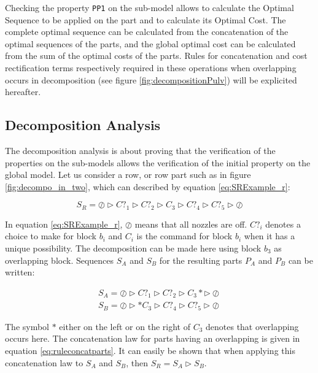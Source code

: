 Checking the property \texttt{PP1} on the sub-model allows to calculate the Optimal Sequence to be applied on the part and to calculate its Optimal Cost. 
The complete optimal sequence can be calculated from the concatenation of the optimal sequences of the parts, and the global optimal cost can be calculated from the sum of the optimal costs of the parts. Rules for concatenation and cost rectification terms respectively required in these operations when overlapping occurs in decomposition (see figure \ref{fig:decompositionPulv}) will be explicited hereafter.



\subsection{Decomposition Analysis}
\label{PreveComp}

The decomposition analysis is about proving that the verification of the properties on the sub-models allows the verification of the initial property on the global model.
Let us consider a row, or row part such as in figure \ref{fig:decompo_in_two}, which can described by equation \ref{eq:SRExample_r}:

\begin{equation}
S_R = \oslash \triangleright C?_{1} \triangleright C?_{2} \triangleright C_{3} \triangleright C?_{4} \triangleright C?_{5} \triangleright \oslash \label{eq:SRExample_r}
\end{equation}

 In equation \ref{eq:SRExample_r}, $\oslash$ means that all nozzles are off. $C?_{i}$ denotes a choice to make for block $b_i$ and $C_{i}$ is the command for block $b_{i}$ when it has a unique possibility. The decomposition can be made here using block $b_3$ as overlapping block.  Sequences $S_A$ and $S_B$ for the resulting parts $P_A$ and $P_B$ can be written:

\begin{eqnarray}
S_A = \oslash \triangleright C?_1 \triangleright C?_2 \triangleright C_{3}* \triangleright \oslash \label{eq:SAExample_r}
\\
S_B = \oslash \triangleright *C_{3} \triangleright C?_4 \triangleright C?_5 \triangleright \oslash \label{eq:SBExample_r}
\end{eqnarray}

The symbol $*$ either on the left or on the right of $C_3$ denotes that overlapping occurs here. The concatenation law for parts having an overlapping is given in equation \ref{eq:ruleconcatparts}. It can easily be shown that when applying this concatenation law to $S_A$ and $S_B$, then $S_R = S_A \triangleright S_B$.

